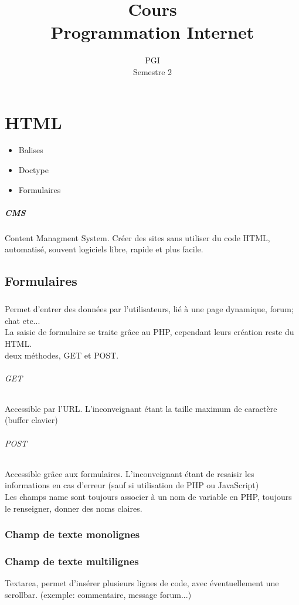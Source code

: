 \documentclass[12pt,a4paper,openany]{article}
\title{Cours\\ Programmation Internet}
\date{PGI\\ Semestre 2}
\begin{document}
	\maketitle
	\chapter{HTML}
		\begin{itemize}
			\item Balises
			\item Doctype
			\item Formulaires
		\end{itemize}
%			
		\paragraph{CMS} Content Managment System. Créer des sites sans utiliser 
		du code HTML, automatisé, souvent logiciels libre, rapide et plus facile.
		\section{Formulaires}
		\paragraph{} Permet d'entrer des données par l'utilisateurs, lié à une 
		page dynamique, forum; chat etc...\\
		La saisie de formulaire se traite grâce au PHP, cependant leurs création
		reste du HTML.\\
		deux méthodes, GET et POST.\\
		\subparagraph{GET} Accessible par l'URL. L'inconveignant étant la taille
		maximum de caractère (buffer clavier)
		\subparagraph{POST} Accessible grâce aux formulaires. L'inconveignant 
		étant de resaisir les informations en cas d'erreur (sauf si utilisation 
		de PHP ou JavaScript) \\
		Les champs name sont toujours associer à un nom de variable en PHP,
		toujours le renseigner, donner des noms claires.
		
		\subsection{Champ de texte monolignes}
			
		\subsection{Champ de texte multilignes}
		Textarea, permet d'insérer plusieurs lignes de code, avec éventuellement 
		une scrollbar. (exemple: commentaire, message forum...)
			
\end{document}
